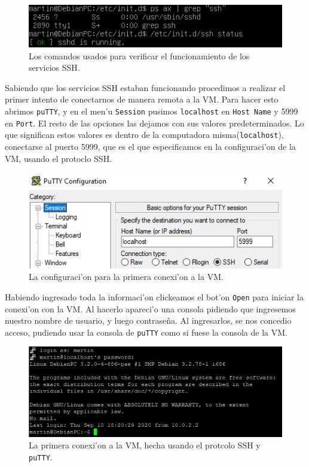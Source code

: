 \documentclass[11pt]{article}
\begin{document}
		\begin{figure}[H]
    			\centering
    			\includegraphics[scale=0.8]{Images/Config/SSH_check.PNG}
    			\caption{Los comandos usados para verificar el funcionamiento de los servicios SSH.}
    			\label{fig:SSH_check}
		\end{figure}
		
		Sabiendo que los servicios SSH estaban funcionando procedimos a realizar el primer intento de conectarnos de manera remota a la VM. Para hacer esto abrimos \texttt{puTTY}, y en el men'u \texttt{Session} pusimos \texttt{localhost} en \texttt{Host Name} y 5999 en \texttt{Port}. El resto de las opciones las dejamos con sus valores predeterminados. Lo que significan estos valores es dentro de la computadora misma(\texttt{localhost}), conectarse al puerto 5999, que es el que especificamos en la configuraci'on de la VM, usando el protoclo SSH.
		
		\begin{figure}[H]
    			\centering
    			\includegraphics[scale=0.9]{Images/Connection/first_connection_attempt.PNG}
    			\caption{La configuraci'on para la primera conexi'on a la VM.}
    			\label{fig:first_connection_attempt}
		\end{figure}
		
		Habiendo ingresado toda la informaci'on clickeamos el bot'on \texttt{Open} para iniciar la conexi'on con la VM. Al hacerlo apareci'o una consola pidiendo que ingresemos nuestro nombre de usuario, y luego contraseña. Al ingresarlos, se nos concedio acceso, pudiendo usar la consola de \texttt{puTTY} como si fuese la consola de la VM. 
		
		\begin{figure}[H]
    			\centering
    			\includegraphics[scale=0.9]{Images/Connection/first_connection_console.PNG}
    			\caption{La primera conexi'on a la VM, hecha usando el protcolo SSH y \texttt{puTTY}.}
    			\label{fig:first_connection_console}
		\end{figure}
		
\end{document}

